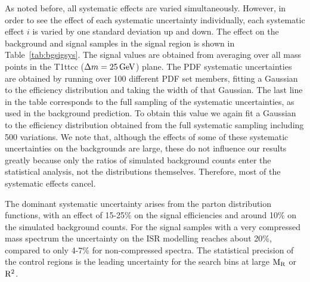 As noted before, all systematic effects are varied simultaneously. However, in order to see the
effect of each systematic uncertainty individually, each systematic effect $i$ is varied by one
standard deviation up and down.  
The effect on the background and signal samples in the signal region is shown in
Table~\ref{tab:bgsigsys}.  
The signal values are obtained from averaging over all mass points in the T1ttcc ($\Delta m =
25\,\text{Ge\hspace{-.08em}V}$) plane.  
The PDF systematic uncertainties are obtained by running
over 100 different PDF set members, fitting a Gaussian to the efficiency distribution and taking the
width of that Gaussian.  
The last line in the table corresponds to the full sampling of the systematic uncertainties, as
used in the background prediction. To obtain this value we again fit a Gaussian to the efficiency
distribution obtained from the full systematic sampling including 500 variations.  We note that,
although the effects of some of these systematic uncertainties on the backgrounds are large, these
do not influence our results greatly because only the  ratios of simulated background counts enter
the statistical analysis, not the distributions themselves.  Therefore, most of the systematic
effects cancel. 

The dominant systematic uncertainty arises from the parton distribution functions, with an effect
of 15-25\% on the signal efficiencies and around 10\% on the simulated background counts. For the
signal samples with a very compressed mass spectrum the uncertainty on the ISR modelling reaches
about 20\%, compared to only 4-7\% for non-compressed spectra. 
The statistical precision of the control regions is the leading uncertainty for the search bins at
large $\mathrm{M_R}$ or $\mathrm{R^2}$. 

 

